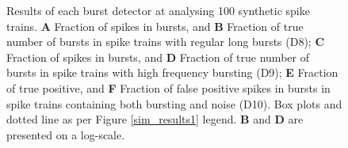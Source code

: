 \documentclass[12pt, titlepage]{article}
\begin{document}
		\begin{figure}
			\centering
			\caption{Results of each burst detector at analysing 100 synthetic spike trains. \textbf{A} Fraction of spikes in bursts, and \textbf{B} Fraction of true number of bursts in spike trains with regular long bursts (D8); \textbf{C} Fraction of spikes in bursts, and \textbf{D} Fraction of true number of bursts in spike trains with high frequency bursting (D9); \textbf{E} Fraction of true positive, and \textbf{F} Fraction of false positive spikes in bursts in spike trains containing both bursting and noise (D10). Box plots and dotted line as per Figure \ref{sim_results1} legend. \textbf{B} and \textbf{D} are presented on a log-scale.}
			\label{sim_results2}
		\end{figure}	
\end{document}
